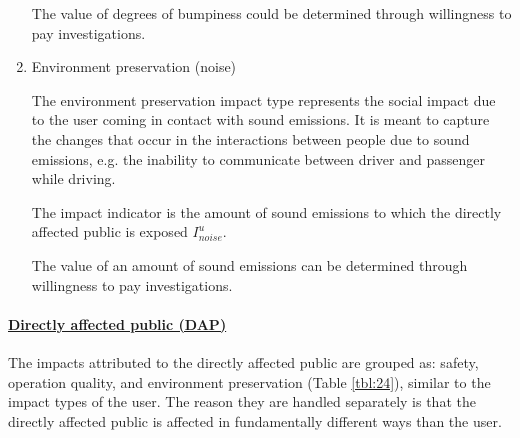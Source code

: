 \begin{enumerate}
The value of degrees of bumpiness could be determined through willingness to pay investigations.

\item Environment preservation (noise)

The environment preservation impact type represents the social impact due to the user coming in contact with sound emissions. It is meant to capture the changes that occur in the interactions between people due to sound emissions, e.g. the inability to communicate between driver and passenger while driving.  

The impact indicator is the amount of sound emissions to which the directly affected public is exposed $I_{noise}^u$.

The value of an amount of sound emissions can be determined through willingness to pay investigations.
  
\end{enumerate}

\paragraph{\underline{Directly affected public (DAP)}} \label{2dap}

The impacts attributed to the directly affected public are grouped as: safety, operation quality, and environment preservation (Table \ref{tbl:24}), similar to the impact types of the user. The reason they are handled separately is that the directly affected public is affected in fundamentally different ways than the user. 

